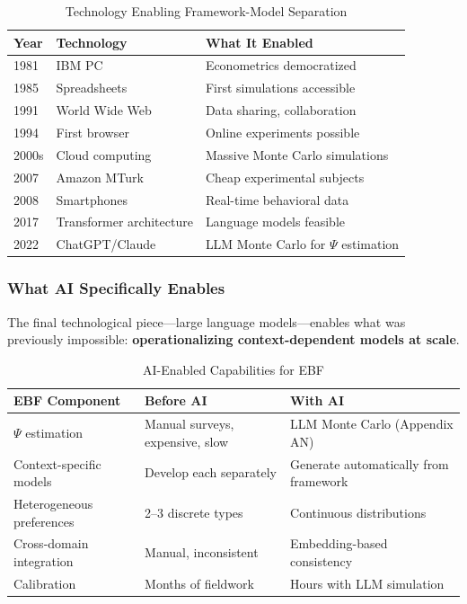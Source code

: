 \begin{table}[htbp]
\centering
\caption{Technology Enabling Framework-Model Separation}
\label{tab:tech-milestones}
\renewcommand{\arraystretch}{1.3}
\small
\begin{tabular}{@{}llp{6cm}@{}}
\toprule
\textbf{Year} & \textbf{Technology} & \textbf{What It Enabled} \\
\midrule
1981 & IBM PC & Econometrics democratized \\
1985 & Spreadsheets & First simulations accessible \\
1991 & World Wide Web & Data sharing, collaboration \\
1994 & First browser & Online experiments possible \\
2000s & Cloud computing & Massive Monte Carlo simulations \\
2007 & Amazon MTurk & Cheap experimental subjects \\
2008 & Smartphones & Real-time behavioral data \\
2017 & Transformer architecture & Language models feasible \\
2022 & ChatGPT/Claude & LLM Monte Carlo for $\Psi$ estimation \\
\bottomrule
\end{tabular}
\end{table}

\subsubsection{What AI Specifically Enables}

The final technological piece---large language models---enables what was
previously impossible: \textbf{operationalizing context-dependent models
at scale}.

\begin{table}[htbp]
\centering
\caption{AI-Enabled Capabilities for EBF}
\label{tab:ai-enables}
\renewcommand{\arraystretch}{1.3}
\small
\begin{tabular}{@{}lp{4.5cm}p{4.5cm}@{}}
\toprule
\textbf{EBF Component} & \textbf{Before AI} & \textbf{With AI} \\
\midrule
$\Psi$ estimation & Manual surveys, expensive, slow &
    LLM Monte Carlo (Appendix AN) \\
Context-specific models & Develop each separately &
    Generate automatically from framework \\
Heterogeneous preferences & 2--3 discrete types &
    Continuous distributions \\
Cross-domain integration & Manual, inconsistent &
    Embedding-based consistency \\
Calibration & Months of fieldwork &
    Hours with LLM simulation \\
\bottomrule
\end{tabular}
\end{table}

